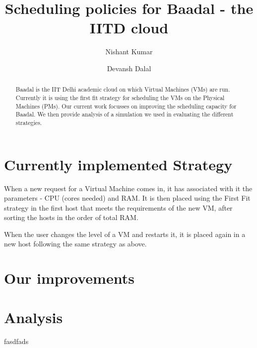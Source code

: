 \documentclass[a4paper,10pt]{article}
\title{Scheduling policies for Baadal - the IITD cloud}
\author{Nishant Kumar \and Devansh Dalal }
\begin{document}
\maketitle
\begin{abstract}
Baadal is the IIT Delhi academic cloud on which Virtual Machines (VMs) are run. Currently it is using the first fit strategy for scheduling the VMs on the Physical Machines (PMs). Our current work focusses on improving the scheduling capacity for Baadal. We then provide analysis of a simulation we used in evaluating the different strategies.
\end{abstract}

\section{Currently implemented Strategy}

When a new request for a Virtual Machine comes in, it has associated with it the parameters - CPU (cores needed) and RAM. It is then placed using the First Fit strategy in the first host that meets the requirements of the new VM, after sorting the hosts in the order of total RAM.

When the user changes the level of a VM and restarts it, it is placed again in a new host following the  same strategy as above. 

\section{Our improvements}



\section{Analysis}
fasdfads
\nocite{*}



\end{document}
